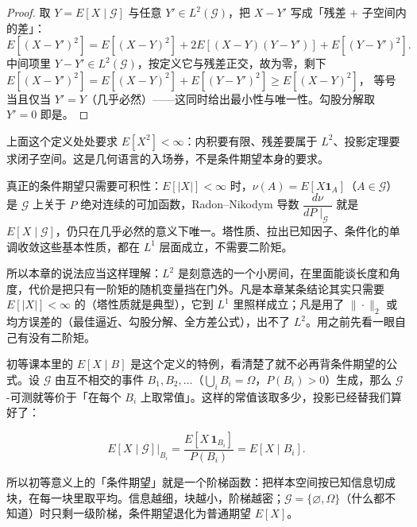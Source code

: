 \begin{proof}
取 $Y=E[X\mid\mathcal{G}]$ 与任意 $Y'\in L^2(\mathcal{G})$，把 $X-Y'$ 写成「残差 $+$ 子空间内的差」：
\[
E[(X-Y')^2]=E[(X-Y)^2]+2E[(X-Y)(Y-Y')]+E[(Y-Y')^2].
\]
中间项里 $Y-Y'\in L^2(\mathcal{G})$，按定义它与残差正交，故为零，剩下
$E[(X-Y')^2]=E[(X-Y)^2]+E[(Y-Y')^2]\ge E[(X-Y)^2]$，
等号当且仅当 $Y'=Y$（几乎必然）——这同时给出最小性与唯一性。勾股分解取 $Y'=0$ 即是。
\end{proof}

\begin{remark}
上面这个定义处处要求 $E[X^2]<\infty$：内积要有限、残差要属于 $L^2$、投影定理要求闭子空间。这是几何语言的入场券，不是条件期望本身的要求。

真正的条件期望只需要可积性：$E[|X|]<\infty$ 时，$\nu(A)=E[X\mathbf{1}_A]$（$A\in\mathcal{G}$）是 $\mathcal{G}$ 上关于 $P$ 绝对连续的可加函数，Radon--Nikodym 导数 $\dfrac{d\nu}{dP\mid_{\mathcal{G}}}$ 就是 $E[X\mid\mathcal{G}]$，仍只在几乎必然的意义下唯一。塔性质、拉出已知因子、条件化的单调收敛这些基本性质，都在 $L^1$ 层面成立，不需要二阶矩。

所以本章的说法应当这样理解：$L^2$ 是刻意选的一个小房间，在里面能谈长度和角度，代价是把只有一阶矩的随机变量挡在门外。凡是本章某条结论其实只需要 $E[|X|]<\infty$ 的（塔性质就是典型），它到 $L^1$ 里照样成立；凡是用了 $\|\cdot\|_2$ 或均方误差的（最佳逼近、勾股分解、全方差公式），出不了 $L^2$。用之前先看一眼自己有没有二阶矩。
\end{remark}

初等课本里的 $E[X\mid B]$ 是这个定义的特例，看清楚了就不必再背条件期望的公式。设 $\mathcal{G}$ 由互不相交的事件 $B_1,B_2,\dots$（$\bigcup_iB_i=\Omega$，$P(B_i)>0$）生成，那么 $\mathcal{G}$-可测就等价于「在每个 $B_i$ 上取常值」。这样的常值该取多少，投影已经替我们算好了：

\[
E[X\mid\mathcal{G}]\Big|_{B_i}=\frac{E[X\,\mathbf{1}_{B_i}]}{P(B_i)}=E[X\mid B_i].
\]

所以初等意义上的「条件期望」就是一个阶梯函数：把样本空间按已知信息切成块，在每一块里取平均。信息越细，块越小，阶梯越密；$\mathcal{G}=\{\varnothing,\Omega\}$（什么都不知道）时只剩一级阶梯，条件期望退化为普通期望 $E[X]$。

